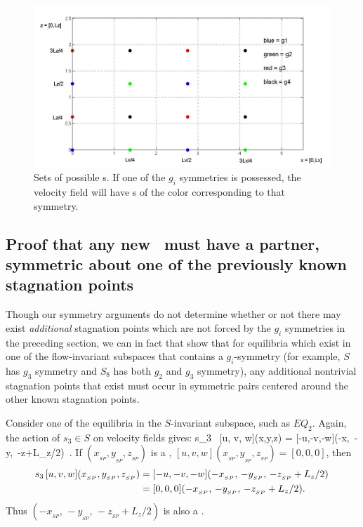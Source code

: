 \documentclass[letter,12pt,openany]{article}
\begin{document}
\begin{figure}[!h]
\includegraphics[width=1.0\textwidth]{stags7_26.jpg}
  \caption{
   Sets of possible \stagp s. If one of the $g_i$ symmetries is
   possessed, the velocity field will have \stagp s of the color
   corresponding to that symmetry.
   }
  \label{eltonFig:stags7_26}
 \end{figure}



\subsection{Proof that any new \stagp\ must have a partner, symmetric about one of the previously known stagnation points}

Though our symmetry arguments do not determine whether or not there may exist \textit{additional} stagnation points which are not forced by the $g_i$ symmetries in the preceding section, we can in fact that show that for equilibria which exist in one of the flow-invariant subspaces that contains a $g_i$-symmetry (for example, $S$ has $g_3$ symmetry and $S_8$ has both $g_2$ and $g_3$ symmetry), any additional nontrivial stagnation points that exist must occur in symmetric pairs centered around the other known stagnation points.

Consider one of the equilibria in the $S$-invariant subspace, such as $EQ_2$. Again, the
 action of $s_3 \in S$ on velocity fields gives:
 \beq    s_3 \, [u, v, w](x,y,z) = [-u,-v,-w](-x,\, -y,\, -z+L_z/2)\nnu\, .
 \eeq
 If $(x_{_{SP}},y_{_{SP}},z_{_{SP}})$ is a \stagp, $[u, v,
 w](x_{_{SP}},y_{_{SP}},z_{_{SP}}) = [0,0,0]$, then
 \begin{align} s_3 \, [u, v, w](x_{_{SP}},y_{_{SP}},z_{_{SP}}) &= [-u,-v,-w](-x_{_{SP}},\, -y_{_{SP}},\, -z_{_{SP}}+L_z/2) \nonumber\, \\
 &= [0,0,0](-x_{_{SP}},\, -y_{_{SP}},\, -z_{_{SP}}+L_z/2) .
 \end{align}
 Thus $(-x_{_{SP}},\, -y_{_{SP}},\, -z_{_{SP}}+L_z/2)$ is also a \stagp.
\end{document}
